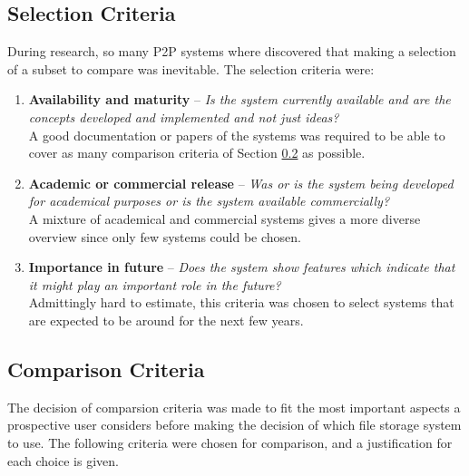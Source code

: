 \subsection{Selection Criteria}
During research, so many P2P systems where discovered that making a selection of a subset to compare was inevitable. The selection criteria were:
\begin{enumerate}
\item \textbf{Availability and maturity} -- \textit{Is the system currently available and are the concepts developed and implemented and not just ideas?}\\
A good documentation or papers of the systems was required to be able to cover as many comparison criteria of Section \ref{subsec:criteria} as possible.

\item \textbf{Academic or commercial release} -- \textit{Was or is the system being developed for academical purposes or is the system available commercially?}\\
A mixture of academical and commercial systems gives a more diverse overview since only few systems could be chosen.

\item \textbf{Importance in future} -- \textit{Does the system show features which indicate that it might play an important role in the future?}\\
Admittingly hard to estimate, this criteria was chosen to select systems that are expected to be around for the next few years.
\end{enumerate}

\subsection{Comparison Criteria}
\label{subsec:criteria}
The decision of comparsion criteria was made to fit the most important aspects a prospective user considers before making the decision of which file storage system to use. The following criteria were chosen for comparison, and a justification for each choice is given.

